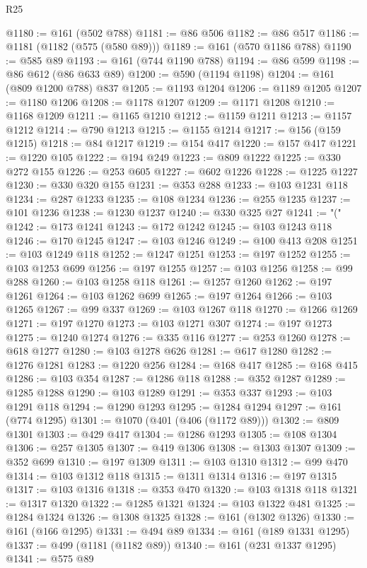 \begin{lexlean}{R25}
\begin{coremodule}
@1180 := @161 (@502 @788)
@1181 := @86 @506
@1182 := @86 @517
@1186 := @1181 (@1182 (@575 (@580 @89)))
@1189 := @161 (@570 @1186 @788)
@1190 := @585 @89
@1193 := @161 (@744 @1190 @788)
@1194 := @86 @599
@1198 := @86 @612 (@86 @633 @89)
@1200 := @590 (@1194 @1198)
@1204 := @161 (@809 @1200 @788) @837
@1205 := @1193 @1204
@1206 := @1189 @1205
@1207 := @1180 @1206
@1208 := @1178 @1207
@1209 := @1171 @1208
@1210 := @1168 @1209
@1211 := @1165 @1210
@1212 := @1159 @1211
@1213 := @1157 @1212
@1214 := @790 @1213
@1215 := @1155 @1214
@1217 := @156 (@159 @1215)
@1218 := @84 @1217
@1219 := @154 @417
@1220 := @157 @417
@1221 := @1220 @105
@1222 := @194 @249
@1223 := @809 @1222
@1225 := @330 @272 @155
@1226 := @253 @605
@1227 := @602 @1226
@1228 := @1225 @1227
@1230 := @330 @320 @155
@1231 := @353 @288
@1233 := @103 @1231 @118
@1234 := @287 @1233
@1235 := @108 @1234
@1236 := @255 @1235
@1237 := @101 @1236
@1238 := @1230 @1237
@1240 := @330 @325 @27
@1241 := "("
@1242 := @173 @1241
@1243 := @172 @1242
@1245 := @103 @1243 @118
@1246 := @170 @1245
@1247 := @103 @1246
@1249 := @100 @413 @208
@1251 := @103 @1249 @118
@1252 := @1247 @1251
@1253 := @197 @1252
@1255 := @103 @1253 @699
@1256 := @197 @1255
@1257 := @103 @1256
@1258 := @99 @288
@1260 := @103 @1258 @118
@1261 := @1257 @1260
@1262 := @197 @1261
@1264 := @103 @1262 @699
@1265 := @197 @1264
@1266 := @103 @1265
@1267 := @99 @337
@1269 := @103 @1267 @118
@1270 := @1266 @1269
@1271 := @197 @1270
@1273 := @103 @1271 @307
@1274 := @197 @1273
@1275 := @1240 @1274
@1276 := @335 @116
@1277 := @253 @1260
@1278 := @618 @1277
@1280 := @103 @1278 @626
@1281 := @617 @1280
@1282 := @1276 @1281
@1283 := @1220 @256
@1284 := @168 @417
@1285 := @168 @415
@1286 := @103 @354
@1287 := @1286 @118
@1288 := @352 @1287
@1289 := @1285 @1288
@1290 := @103 @1289
@1291 := @353 @337
@1293 := @103 @1291 @118
@1294 := @1290 @1293
@1295 := @1284 @1294
@1297 := @161 (@774 @1295)
@1301 := @1070 (@401 (@406 (@1172 @89)))
@1302 := @809 @1301
@1303 := @429 @417
@1304 := @1286 @1293
@1305 := @108 @1304
@1306 := @257 @1305
@1307 := @419 @1306
@1308 := @1303 @1307
@1309 := @352 @699
@1310 := @197 @1309
@1311 := @103 @1310
@1312 := @99 @470
@1314 := @103 @1312 @118
@1315 := @1311 @1314
@1316 := @197 @1315
@1317 := @103 @1316
@1318 := @353 @470
@1320 := @103 @1318 @118
@1321 := @1317 @1320
@1322 := @1285 @1321
@1324 := @103 @1322 @481
@1325 := @1284 @1324
@1326 := @1308 @1325
@1328 := @161 (@1302 @1326)
@1330 := @161 (@166 @1295)
@1331 := @494 @89
@1334 := @161 (@189 @1331 @1295)
@1337 := @499 (@1181 (@1182 @89))
@1340 := @161 (@231 @1337 @1295)
@1341 := @575 @89

\end{coremodule}
\end{lexlean}
